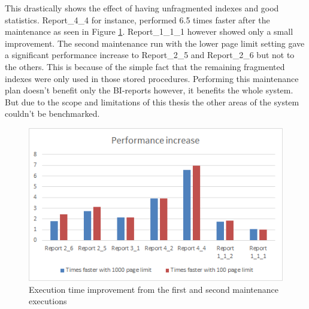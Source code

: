 \documentclass{cslthse-msc}
\begin{document}
This drastically shows the effect of having unfragmented indexes and good statistics. Report\_4\_4 for instance, performed 6.5 times faster after the maintenance as seen in Figure \ref{fig:beforeaftertimes}. Report\_1\_1\_1 however showed only a small improvement. The second maintenance run with the lower page limit setting gave a significant performance increase to Report\_2\_5 and Report\_2\_6 but not to the others. This is because of the simple fact that the remaining fragmented indexes were only used in those stored procedures. Performing this maintenance plan doesn't benefit only the BI-reports however, it benefits the whole system. But due to the scope and limitations of this thesis the other areas of the system couldn't be benchmarked.

\begin{figure}[H]
\begin{center}
\includegraphics[scale=1]{Pictures/beforeAndAfterMaintenancetimes.png}
\caption{Execution time improvement from the first and second maintenance executions}
\label{fig:beforeaftertimes}
\end{center}
\end{figure}
\end{document}
